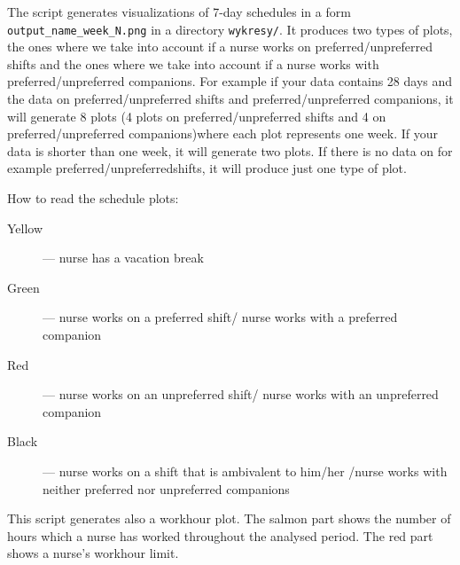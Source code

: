 The script generates visualizations of 7-day schedules in a form \texttt{output\_name\_week\_N.png} in a directory \texttt{wykresy/}. It produces two types of plots, the ones where we take into account if a nurse works on preferred/unpreferred shifts and the ones where we take into account if a nurse works with preferred/unpreferred companions. For example if your data contains 28 days and the data on preferred/unpreferred shifts and preferred/unpreferred companions, it will generate 8 plots (4 plots on preferred/unpreferred shifts and 4 on preferred/unpreferred companions)where each plot represents one week. If your data is shorter than one week, it will generate two plots. If there is no data on for example preferred/unpreferredshifts, it will produce just one type of plot.

How to read the schedule plots:

\begin{description}
    \item[Yellow] --- nurse has a vacation break
    \item[Green] --- nurse works on a preferred shift/ nurse works with a preferred companion
    \item[Red] --- nurse works on an unpreferred shift/ nurse works with an unpreferred companion
    \item[Black] --- nurse works on a shift that is ambivalent to him/her /nurse works with neither preferred nor unpreferred companions
\end{description}

This script generates also a workhour plot. The salmon part shows the number of hours which a nurse has worked throughout the analysed period. The red part shows a nurse's workhour limit.
